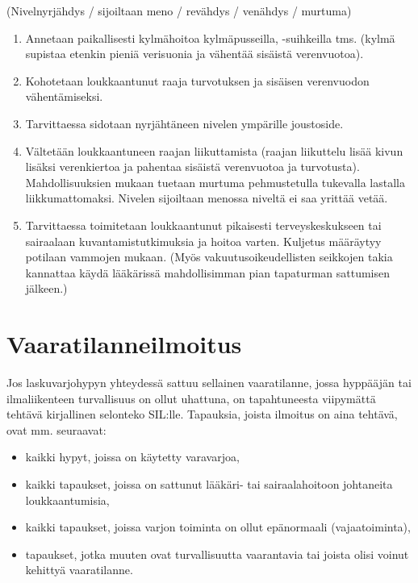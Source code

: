 (Nivelnyrjähdys / sijoiltaan meno / revähdys / venähdys / murtuma) 

\begin{enumerate}[label=\bfseries \arabic*)]
\item  Annetaan paikallisesti kylmähoitoa kylmäpusseilla, -suihkeilla tms. (kylmä supistaa etenkin pieniä verisuonia ja vähentää sisäistä verenvuotoa). 
\item  Kohotetaan loukkaantunut raaja turvotuksen ja sisäisen verenvuodon vähentämiseksi. 
\item  Tarvittaessa sidotaan nyrjähtäneen nivelen ympärille joustoside. 
\item  Vältetään loukkaantuneen raajan liikuttamista (raajan liikuttelu lisää kivun lisäksi verenkiertoa ja pahentaa sisäistä verenvuotoa ja turvotusta). Mahdollisuuksien mukaan tuetaan murtuma pehmustetulla tukevalla lastalla liikkumattomaksi. Nivelen sijoiltaan menossa niveltä ei saa yrittää vetää. 
\item  Tarvittaessa toimitetaan loukkaantunut pikaisesti terveyskeskukseen tai sairaalaan kuvantamistutkimuksia ja hoitoa varten. Kuljetus määräytyy potilaan vammojen mukaan. (Myös vakuutusoikeudellisten seikkojen takia kannattaa käydä lääkärissä mahdollisimman pian tapaturman sattumisen jälkeen.) 
\end{enumerate}
\section{ Vaaratilanneilmoitus }
\label{riskitekijat-toiminta-onnettomuustilanteessa-ja-ensiapu-vaaratilanneilmoitus}


Jos laskuvarjohypyn yhteydessä sattuu sellainen vaaratilanne, jossa hyppääjän tai ilmaliikenteen turvallisuus on ollut uhattuna, on tapahtuneesta viipymättä tehtävä kirjallinen selonteko SIL:lle. Tapauksia, joista ilmoitus on aina tehtävä, ovat mm. seuraavat: 

\begin{itemize}
\item  kaikki hypyt, joissa on käytetty varavarjoa, 
\item  kaikki tapaukset, joissa on sattunut lääkäri- tai sairaalahoitoon johtaneita loukkaantumisia, 
\item  kaikki tapaukset, joissa varjon toiminta on ollut epänormaali (vajaatoiminta), 
\item  tapaukset, jotka muuten ovat turvallisuutta vaarantavia tai joista olisi voinut kehittyä vaaratilanne. 
\end{itemize}


